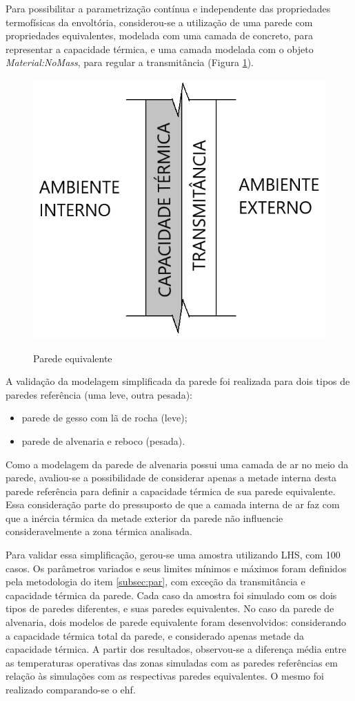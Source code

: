 \documentclass[brazil,hardcopy,openany]{ufscthesis} %
\begin{document}
Para possibilitar a parametrização contínua e independente das propriedades termofísicas da envoltória, considerou-se a utilização de uma parede com propriedades equivalentes, modelada com uma camada de concreto, para representar a capacidade térmica, e uma camada modelada com o objeto \textit{Material:NoMass}, para regular a transmitância (Figura \ref{fig:parede_eq}).

\begin{figure}[h]
	\centering
	\caption{Parede equivalente}
	\includegraphics[width=.3\linewidth]{img/parede_eq2.png}
	\label{fig:parede_eq}
\end{figure}

A validação da modelagem simplificada da parede foi realizada para dois tipos de paredes referência (uma leve, outra pesada):

\begin{itemize}
	\item parede de gesso com lã de rocha (leve);
	\item parede de alvenaria e reboco (pesada).
\end{itemize}

Como a modelagem da parede de alvenaria possui uma camada de ar no meio da parede, avaliou-se a possibilidade de considerar apenas a metade interna desta parede referência para definir a capacidade térmica de sua parede equivalente. Essa consideração parte do pressuposto de que a camada interna de ar faz com que a inércia térmica da metade exterior da parede não influencie consideravelmente a zona térmica analisada.

Para validar essa simplificação, gerou-se uma amostra utilizando LHS, com 100 casos.
Os parâmetros variados e seus limites mínimos e máximos foram definidos pela metodologia do item \ref{subsec:par}, com exceção da transmitância e capacidade térmica da parede.  %
Cada caso da amostra foi simulado com os dois tipos de paredes diferentes, e suas paredes equivalentes. No caso da parede de alvenaria, dois modelos de parede equivalente foram desenvolvidos: considerando a capacidade térmica total da parede, e considerado apenas metade da capacidade térmica.
A partir dos resultados, observou-se a diferença média entre as temperaturas operativas das zonas simuladas com as paredes referências em relação às simulações com as respectivas paredes equivalentes. O mesmo foi realizado comparando-se o \acrshort{ehf}.
\end{document}
